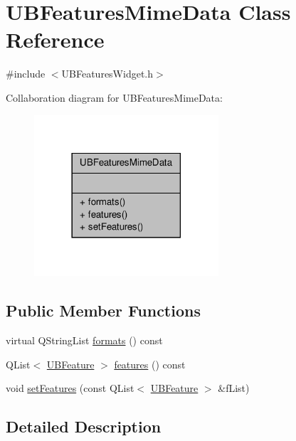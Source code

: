\hypertarget{class_u_b_features_mime_data}{\section{U\-B\-Features\-Mime\-Data Class Reference}
\label{d9/d29/class_u_b_features_mime_data}
}


{\ttfamily \#include $<$U\-B\-Features\-Widget.\-h$>$}



Collaboration diagram for U\-B\-Features\-Mime\-Data\-:
\nopagebreak
\begin{figure}[H]
\begin{center}
\leavevmode
\includegraphics[width=194pt]{d9/d4c/class_u_b_features_mime_data__coll__graph}
\end{center}
\end{figure}
\subsection*{Public Member Functions}
\begin{DoxyCompactItemize}
\item 
virtual Q\-String\-List \hyperlink{class_u_b_features_mime_data_a1a976809258ff4e08646c310e35752e1}{formats} () const 
\item 
Q\-List$<$ \hyperlink{class_u_b_feature}{U\-B\-Feature} $>$ \hyperlink{class_u_b_features_mime_data_a4d755ceb10b1e9b239001fbe1e8b4c21}{features} () const 
\item 
void \hyperlink{class_u_b_features_mime_data_a1319851bb37d9c6ee49d62a67cb73e9f}{set\-Features} (const Q\-List$<$ \hyperlink{class_u_b_feature}{U\-B\-Feature} $>$ \&f\-List)
\end{DoxyCompactItemize}


\subsection{Detailed Description}


